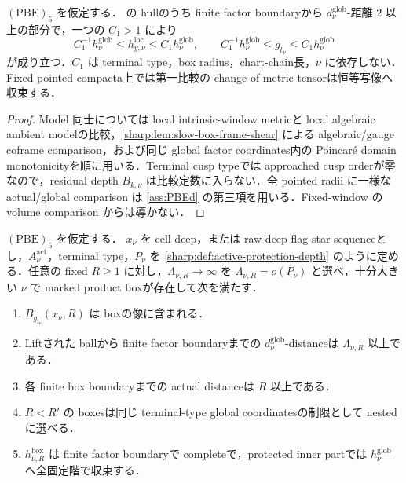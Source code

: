 \documentclass[a4paper,11pt]{ltjsarticle}
\numberwithin{equation}{section}
\theoremstyle{plain}
\theoremstyle{definition}
\theoremstyle{remark}
\begin{document}
\begin{lemma}\label{sharp:lem:protected-global-comparison}
$\mathrm{(PBE)}_5$ を仮定する．
 の hullのうち finite factor boundaryから $d^{\mathrm{glob}}_\nu$-距離 $2$ 以上の部分で，一つの $C_1>1$ により
\[
 C_1^{-1}h^{\mathrm{glob}}_\nu\le h^{\mathrm{loc}}_{y,\nu}\le C_1h^{\mathrm{glob}}_\nu,
 \qquad
 C_1^{-1}h^{\mathrm{glob}}_\nu\le g_{t_\nu}\le C_1h^{\mathrm{glob}}_\nu
\]
が成り立つ．$C_1$ は terminal type，box radius，chart-chain長，$\nu$ に依存しない．Fixed pointed compacta上では第一比較の change-of-metric tensorは恒等写像へ収束する．
\end{lemma}

\begin{proof}
Model 同士については local intrinsic-window metricと local algebraic ambient modelの比較，\cref{sharp:lem:slow-box-frame-shear} による algebraic/gauge coframe comparison，および同じ global factor coordinates内の Poincaré domain monotonicityを順に用いる．Terminal cusp typeでは approached cusp orderが零なので，residual depth $B_{k,\nu}$ は比較定数に入らない．全 pointed radii に一様な actual/global comparison は \cref{ass:PBEd} の第三項を用いる．Fixed-window の volume comparison からは導かない．
\end{proof}

\begin{lemma}\label{sharp:lem:product-box}
$\mathrm{(PBE)}_5$ を仮定する．
$x_\nu$ を cell-deep，または raw-deep flag-star sequenceとし，$A_\nu^{\mathrm{act}}$，terminal type，$P_\nu$ を \cref{sharp:def:active-protection-depth} のように定める．任意の fixed $R\ge1$ に対し，$\Lambda_{\nu,R}\to\infty$ を $\Lambda_{\nu,R}=o(P_\nu)$ と選べ，十分大きい $\nu$ で marked product boxが存在して次を満たす．
\begin{enumerate}[label=\textup{(PB\arabic*)}]
\item $B_{g_{t_\nu}}(x_\nu,R)$ は boxの像に含まれる．
\item Liftされた ballから finite factor boundaryまでの $d^{\mathrm{glob}}_\nu$-distanceは $\Lambda_{\nu,R}$ 以上である．
\item 各 finite box boundaryまでの actual distanceは $R$ 以上である．
\item $R<R'$ の boxesは同じ terminal-type global coordinatesの制限として nestedに選べる．
\item $h^{\mathrm{box}}_{\nu,R}$ は finite factor boundaryで completeで，protected inner partでは $h^{\mathrm{glob}}_\nu$ へ全固定階で収束する．
\end{enumerate}
\end{lemma}
\end{document}
